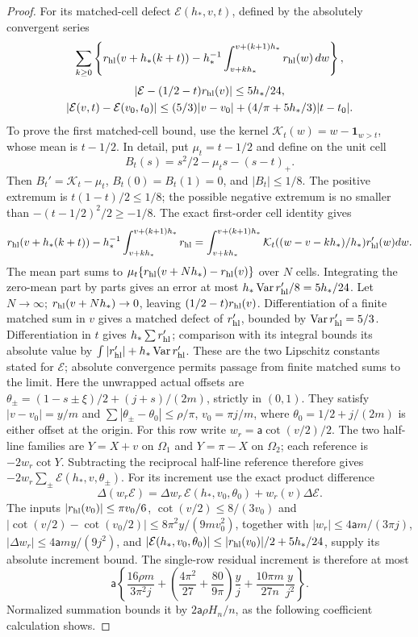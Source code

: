 \begin{proof}
For its matched-cell defect $\mathcal E(h_*,v,t)$,
defined by the absolutely convergent series
\[
 \sum_{k\geq0}\left\{r_{\rm hl}(v+h_*(k+t))
       -h_*^{-1}\int_{v+kh_*}^{v+(k+1)h_*}r_{\rm hl}(w)\,dw\right\},
\]
\[
 \begin{gathered}
 |\mathcal E-(1/2-t)r_{\rm hl}(v)|\leq5h_*/24,\\
 |\mathcal E(v,t)-\mathcal E(v_0,t_0)|
 \leq(5/3)|v-v_0|+(4/\pi+5h_*/3)|t-t_0|.
 \end{gathered}
\]
To prove the first matched-cell bound, use the kernel
$\mathcal K_t(w)=w-\mathbf1_{w>t}$, whose mean is $t-1/2$.
In detail, put $\mu_t=t-1/2$ and define on the unit cell
\[
 B_t(s)=s^2/2-\mu_ts-(s-t)_+.
\]
Then $B_t'=\mathcal K_t-\mu_t$, $B_t(0)=B_t(1)=0$, and
$|B_t|\leq1/8$. The positive extremum is $t(1-t)/2\leq1/8$;
the possible negative extremum is no smaller than
$-(t-1/2)^2/2\geq-1/8$. The exact first-order cell identity gives
\[
 r_{\rm hl}(v+h_*(k+t))-h_*^{-1}\int_{v+kh_*}^{v+(k+1)h_*}r_{\rm hl}
 =\int_{v+kh_*}^{v+(k+1)h_*}
               \mathcal K_t((w-v-kh_*)/h_*)r_{\rm hl}'(w)dw.
\]
The mean part sums to
$\mu_t\{r_{\rm hl}(v+Nh_*)-r_{\rm hl}(v)\}$ over $N$ cells. Integrating the
zero-mean part by parts gives an error at most
$h_*\operatorname{Var}r_{\rm hl}'/8=5h_*/24$. Let $N\to\infty$;
$r_{\rm hl}(v+Nh_*)\to0$, leaving $(1/2-t)r_{\rm hl}(v)$.
Differentiation of a finite matched sum in $v$ gives a matched defect
of $r_{\rm hl}'$, bounded by $\operatorname{Var}r_{\rm hl}'=5/3$. Differentiation in
$t$ gives $h_*\sum r_{\rm hl}'$; comparison with its integral bounds its
absolute value by $\int|r_{\rm hl}'|+h_*\operatorname{Var}r_{\rm hl}'$. These are the two Lipschitz constants stated for $\mathcal E$;
absolute convergence permits passage from finite matched sums to the limit. Here the unwrapped actual offsets are
$\theta_\pm=(1-s\pm\xi)/2+(j+s)/(2m)$, strictly in $(0,1)$.
They satisfy $|v-v_0|=y/m$ and
$\sum|\theta_\pm-\theta_0|\leq\rho/\pi$, $v_0=\pi j/m$,
where $\theta_0=1/2+j/(2m)$ is either offset at the origin.
For this row write $w_r=\mathsf a\cot(v/2)/2$. The two half-line families are $Y=X+v$ on $\Omega_1$ and
$Y=\pi-X$ on $\Omega_2$; each reference is $-2w_r\cot Y$.
Subtracting the reciprocal half-line reference therefore gives
$-2w_r\sum_\pm\mathcal E(h_*,v,\theta_\pm)$.
For its increment use the exact product difference
\[
 \Delta(w_r\mathcal E)=\Delta w_r\,\mathcal E(h_*,v_0,\theta_0)
                        +w_r(v)\Delta\mathcal E.
\]
The inputs $|r_{\rm hl}(v_0)|\leq\pi v_0/6$,
$\cot(v/2)\leq8/(3v_0)$ and
$|\cot(v/2)-\cot(v_0/2)|\leq8\pi^2y/(9mv_0^2)$,
together with
$|w_r|\leq4\mathsf a m/(3\pi j)$,
$|\Delta w_r|\leq4\mathsf a my/(9j^2)$, and
$|\mathcal E(h_*,v_0,\theta_0)|\leq|r_{\rm hl}(v_0)|/2+5h_*/24$,
supply its absolute increment bound.
The single-row residual increment is therefore at most
\[
 \mathsf{a}\left\{\frac{16\rho m}{3\pi^2j}
 +\left(\frac{4\pi^2}{27}+\frac{80}{9\pi}\right)\frac yj
 +\frac{10\pi m}{27n}\frac y{j^2}\right\}.
\]
Normalized summation bounds it by $2\mathsf a\rho H_n/n$, as the
following coefficient calculation shows.


\end{proof}
